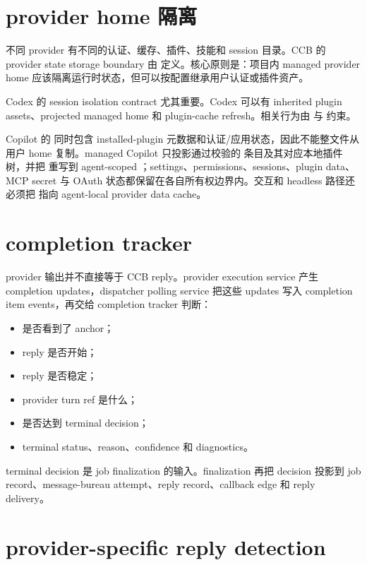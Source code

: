 \section{provider home 隔离}

不同 provider 有不同的认证、缓存、插件、技能和 session 目录。CCB 的 provider state storage boundary 由  定义。核心原则是：项目内 managed provider home 应该隔离运行时状态，但可以按配置继承用户认证或插件资产。

Codex 的 session isolation contract 尤其重要。Codex 可以有 inherited plugin assets、projected managed home 和 plugin-cache refresh。相关行为由  与  约束。

Copilot 的  同时包含 installed-plugin 元数据和认证/应用状态，因此不能整文件从用户 home 复制。managed Copilot 只投影通过校验的  条目及其对应本地插件树，并把  重写到 agent-scoped ；settings、permissions、sessions、plugin data、MCP secret 与 OAuth 状态都保留在各自所有权边界内。交互和 headless 路径还必须把  指向 agent-local provider data cache。

\section{completion tracker}

provider 输出并不直接等于 CCB reply。provider execution service 产生 completion updates，dispatcher polling service 把这些 updates 写入 completion item events，再交给 completion tracker 判断：

\begin{itemize}
  \item 是否看到了 anchor；
  \item reply 是否开始；
  \item reply 是否稳定；
  \item provider turn ref 是什么；
  \item 是否达到 terminal decision；
  \item terminal status、reason、confidence 和 diagnostics。
\end{itemize}

terminal decision 是 job finalization 的输入。finalization 再把 decision 投影到 job record、message-bureau attempt、reply record、callback edge 和 reply delivery。

\section{provider-specific reply detection}

